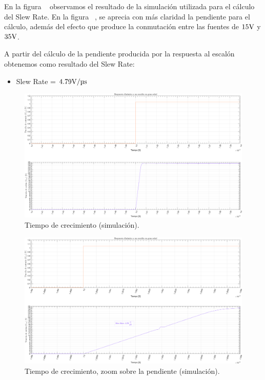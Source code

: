 \par En la figura ~ observamos el resultado de la simulación utilizada para el cálculo del Slew Rate. En la figura  ~, se aprecia con más claridad la pendiente para el cálculo, además del efecto que produce la conmutación entre las fuentes de $15 \si[per-mode=symbol]{\volt}$ y $35 \si[per-mode=symbol]{\volt}$.

\par A partir del cálculo de la pendiente producida por la respuesta al escalón obtenemos como resultado del Slew Rate:

\begin{itemize}
    \item Slew Rate = $4.79 \si[per-mode=symbol]{\volt\per\micro\second}$
\end{itemize}

\vfill

\clearpage

\begin{figure}[H]
    \centering
    \includegraphics[height=0.66 \textwidth, angle=90]{./img/simulaciones/Slew_Rate/Slew_Rate.png}
    \caption{Tiempo de crecimiento (simulación).}
    \label{fig:Slew_Rate}
\end{figure}

\clearpage

\begin{figure}[H]
    \centering
    \includegraphics[height=0.66 \textwidth, angle=90]{./img/simulaciones/Slew_Rate/amplifier_SR_zoom.png}
    \caption{Tiempo de crecimiento, zoom sobre la pendiente  (simulación).}
    \label{fig:Slew_Rate_zoom}
\end{figure}

\clearpage